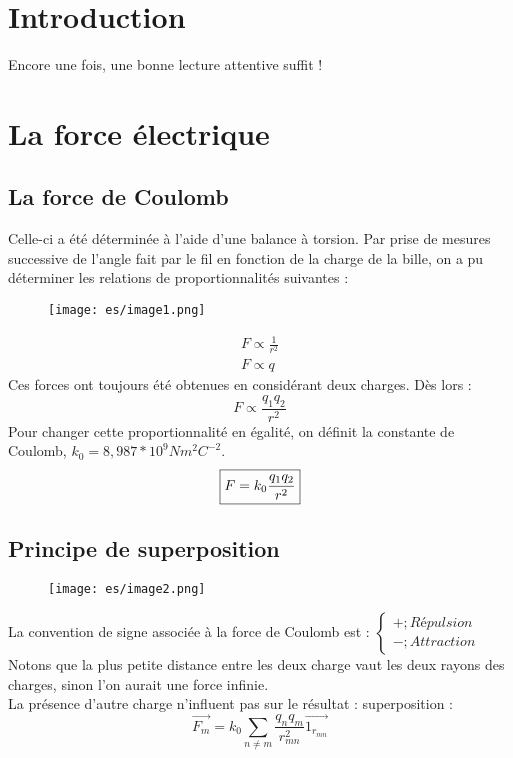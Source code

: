 \documentclass[british,french,11pt, a4paper, openany]{book}
\begin{document}
\section{Introduction}
Encore une fois, une bonne lecture attentive suffit !

\section{La force électrique}
\subsection{La force de Coulomb}
Celle-ci a été déterminée à l'aide d'une balance à torsion. Par prise de mesures successive de l'angle fait par le fil en fonction de la charge de la bille, on a pu déterminer les relations de proportionnalités suivantes :
\begin{wrapfigure}[7]{r}{4cm}
	\texttt{[image: es/image1.png]}
\end{wrapfigure}
\begin{eqnarray}
	F \propto \frac{1}{r^2}\\
	F \propto q
\end{eqnarray}
Ces forces ont toujours été obtenues en considérant deux charges. Dès lors :
\begin{equation}
	F \propto \frac{q_1q_2}{r^2}
\end{equation}
Pour changer cette proportionnalité en égalité, on définit la constante de Coulomb, $k_0 = 8,987*10^9 Nm^2C^{-2}$.
\begin{equation}
	\fbox{$ F = k_0 \dfrac{q_1q_2}{r^2}$}
\end{equation}

\subsection{Principe de superposition}
\begin{wrapfigure}[7]{l}{4cm}
	\texttt{[image: es/image2.png]}
\end{wrapfigure}
La convention de signe associée à la force de Coulomb est : $\left\{\begin{array}{l}
+ ; Répulsion\\
- ; Attraction
\end{array}\right.$\\

Notons que la plus petite distance entre les deux charge vaut les deux rayons des charges, sinon l'on aurait une force infinie.\\
La présence d'autre charge n'influent pas sur le résultat :  superposition :
\begin{equation}
	\vec{F_m} = k_0\sum_{n\neq m} \frac{q_nq_m}{r^2_{mn}}\vec{1_{r_{mn}}}
\end{equation}
\end{document}
